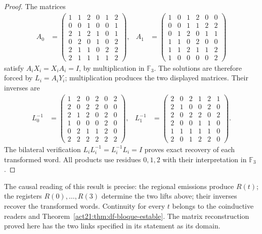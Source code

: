 \begin{proof}
The matrices
\begin{align*}
 A_0&=\begin{pmatrix}
1&1&2&0&1&2\\0&0&1&0&0&1\\2&1&2&1&0&1\\
0&2&0&1&0&2\\2&1&1&0&2&2\\2&1&1&1&1&2
\end{pmatrix},&
 A_1&=\begin{pmatrix}
1&0&1&2&0&0\\0&0&1&1&2&2\\0&1&2&0&1&1\\
1&1&0&2&0&0\\1&1&2&1&1&2\\1&0&0&0&0&2
\end{pmatrix}
\end{align*}
satisfy \(A_iX_i=X_iA_i=I\), by multiplication in \(\mathbb F_3\).
The solutions are therefore forced by \(L_i=A_iY_i\); multiplication
produces the two displayed matrices. Their inverses are
\begin{align*}
 L_0^{-1}&=\begin{pmatrix}
1&2&0&2&0&2\\2&0&2&2&0&0\\2&1&2&0&2&0\\
1&0&0&0&2&0\\0&2&1&1&2&0\\2&2&2&2&2&2
\end{pmatrix},&
 L_1^{-1}&=\begin{pmatrix}
2&0&2&1&2&1\\2&1&0&0&2&0\\2&0&2&2&0&2\\
2&0&0&1&1&0\\1&1&1&1&1&0\\2&0&1&2&2&0
\end{pmatrix}.
\end{align*}
The bilateral verification \(L_iL_i^{-1}=L_i^{-1}L_i=I\) proves exact
recovery of each transformed word. All products use residues \(0,1,2\)
with their interpretation in \(\mathbb F_3\).
\end{proof}

The causal reading of this result is precise: the regional emissions
produce \(R(t)\); the registers \(R(0),\ldots,R(3)\) determine the two
lifts above; their inverses recover the transformed words. Continuity
for every \(t\) belongs to the coinductive readers and
Theorem~\ref{act21:thm:df-bloque-estable}. The matrix reconstruction proved here
has the two links specified in its statement as its domain.

